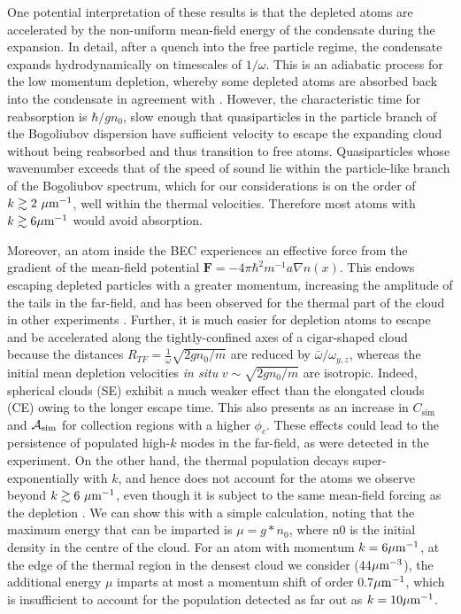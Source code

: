 {    One potential interpretation of these results is that the depleted atoms are accelerated by the non-uniform mean-field energy of the condensate during the expansion.
	In detail, after a quench into the free particle regime, the condensate expands hydrodynamically on timescales of $1/\omega$. 
	This is an adiabatic process for the low momentum depletion, whereby some depleted atoms are absorbed back into the condensate in agreement with \cite{Qu16}.
	However, the characteristic time for reabsorption is $\hbar/gn_0$, slow enough that quasiparticles in the particle branch of the Bogoliubov dispersion have sufficient velocity to escape the expanding cloud without being reabsorbed and thus transition to free atoms. 
	Quasiparticles whose wavenumber exceeds that of the speed of sound lie within the particle-like branch of the Bogoliubov spectrum, which for our considerations is on the order of $k\gtrsim2~\mu\textrm{m}^{-1}$, well within the thermal velocities. Therefore most atoms with $k\gtrsim 6 \mu\textrm{m}^{-1}$ would avoid absorption.
	
	Moreover, an atom inside the BEC experiences an effective force from the gradient of the mean-field potential $\textbf{F} = -4\pi\hbar^2 m^{-1}a \nabla  n(x)$. 
	This endows escaping depleted particles with a greater momentum, increasing the amplitude of the tails in the far-field, and has been observed for the thermal part of the cloud in other experiments \cite{Ozeri02}.
	Further, it is much easier for depletion atoms to escape and be accelerated along the tightly-confined axes of a cigar-shaped cloud because the distances $R_{TF}=\frac{1}{\omega}\sqrt{2gn_0/m}$ are reduced by $\bar{\omega}/\omega_{y,z}$, whereas the initial mean depletion velocities \textit{in situ} $v\sim \sqrt{2gn_0/m}$ are isotropic.
	Indeed, spherical clouds (SE) exhibit a much weaker effect than the elongated clouds (CE) owing to the longer escape time.
	This also presents as an increase in $C_\textrm{sim}$ {and $\mathcal{A}_{\rm sim}$ for} collection regions {with a higher $\phi_c$}. 
    These effects could lead to the persistence of populated high-$k$ modes in the far-field, as were detected in the experiment.
	On the other hand, the thermal population decays super-exponentially with $k$, and hence does not account for the atoms we observe beyond $k\gtrsim 6~\mu\textrm{m}^{-1}$, even though it is subject to the same mean-field forcing as the depletion \cite{Ozeri02}.
	We can show this with a simple calculation, noting that the maximum energy that can be imparted is $\mu=g*n_0$, where n0 is the initial density in the centre of the cloud.
	For an atom with momentum $k=6\mu\textrm{m}^{-1}$, at the edge of the thermal region in the densest cloud we consider (44$\mu\textrm{m}^{-3}$), the additional energy $\mu$ imparts at most a momentum shift of order 0.7$\mu\textrm{m}^{-1}$, which is insufficient to account for the population detected as far out as $k=10\mu\textrm{m}^{-1}$.
	
}
